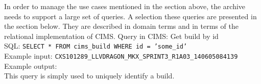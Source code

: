 
In order to manage the use cases mentioned in the section above, the archive needs to support a large set of queries. A selection these queries are presented in the section below. They are described in domain terms and in terms of the relational implementation of CIMS.
\label{q:getbuild}
Query in CIMS: Get build by id \\
SQL: {\tt SELECT * FROM cims\_build WHERE id = 'some\_id'} \\
Example input: {\tt CXS101289\_LLVDRAGON\_MKX\_SPRINT3\_R1A03\_140605084139 } \\
Example output: \\
This query is simply used to uniquely identify a build.

